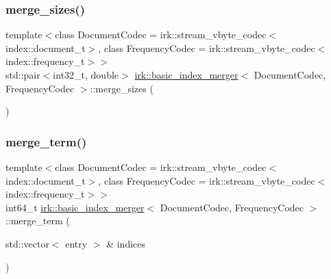 \mbox{\label{classirk_1_1basic__index__merger_a243264cb144d805392d61266254925ee}} 
\subsubsection{\texorpdfstring{merge\+\_\+sizes()}{merge\_sizes()}}
{\footnotesize\ttfamily template$<$class Document\+Codec  = irk\+::stream\+\_\+vbyte\+\_\+codec$<$index\+::document\+\_\+t$>$, class Frequency\+Codec  = irk\+::stream\+\_\+vbyte\+\_\+codec$<$index\+::frequency\+\_\+t$>$$>$ \\
std\+::pair$<$int32\+\_\+t, double$>$ \mbox{\hyperlink{classirk_1_1basic__index__merger}{irk\+::basic\+\_\+index\+\_\+merger}}$<$ Document\+Codec, Frequency\+Codec $>$\+::merge\+\_\+sizes (\begin{DoxyParamCaption}{ }\end{DoxyParamCaption})\hspace{0.3cm}{\ttfamily [inline]}}

\mbox{\label{classirk_1_1basic__index__merger_ade56595ec2e771cf4b5a6e6942d4187a}} 
\subsubsection{\texorpdfstring{merge\+\_\+term()}{merge\_term()}}
{\footnotesize\ttfamily template$<$class Document\+Codec  = irk\+::stream\+\_\+vbyte\+\_\+codec$<$index\+::document\+\_\+t$>$, class Frequency\+Codec  = irk\+::stream\+\_\+vbyte\+\_\+codec$<$index\+::frequency\+\_\+t$>$$>$ \\
int64\+\_\+t \mbox{\hyperlink{classirk_1_1basic__index__merger}{irk\+::basic\+\_\+index\+\_\+merger}}$<$ Document\+Codec, Frequency\+Codec $>$\+::merge\+\_\+term (\begin{DoxyParamCaption}\item[{std\+::vector$<$ entry $>$ \&}]{indices }\end{DoxyParamCaption})\hspace{0.3cm}{\ttfamily [inline]}}

